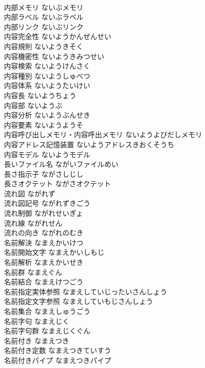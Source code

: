 \documentclass[8pt]{extreport}
\begin{document}
\begin{CJK}{UTF8}{min}
\\	内部メモリ	ないぶメモリ	
\\	内部ラベル	ないぶラベル	
\\	内部リンク	ないぶリンク	
\\	内容完全性	ないようかんぜんせい	
\\	内容規則	ないようきそく	
\\	内容機密性	ないようきみつせい	
\\	内容検索	ないようけんさく	
\\	内容種別	ないようしゅべつ	
\\	内容体系	ないようたいけい	
\\	内容長	ないようちょう	
\\	内容部	ないようぶ	
\\	内容分析	ないようぶんせき	
\\	内容要素	ないようようそ	
\\	内容呼び出しメモリ・内容呼出メモリ	ないようよびだしメモリ	
\\	内容アドレス記憶装置	ないようアドレスきおくそうち	
\\	内容モデル	ないようモデル	
\\	長いファイル名	ながいファイルめい	
\\	長さ指示子	ながさしじし	
\\	長さオクテット	ながさオクテット	
\\	流れ図	ながれず	
\\	流れ図記号	ながれずきごう	
\\	流れ制御	ながれせいぎょ	
\\	流れ線	ながれせん	
\\	流れの向き	ながれのむき	
\\	名前解決	なまえかいけつ	
\\	名前開始文字	なまえかいしもじ	
\\	名前解析	なまえかいせき	
\\	名前群	なまえぐん	
\\	名前結合	なまえけつごう	
\\	名前指定実体参照	なまえしていじったいさんしょう	
\\	名前指定文字参照	なまえしていもじさんしょう	
\\	名前集合	なまえしゅうごう	
\\	名前字句	なまえじく	
\\	名前字句群	なまえじくぐん	
\\	名前付き	なまえつき	
\\	名前付き定数	なまえつきていすう	
\\	名前付きパイプ	なまえつきパイプ	

\end{CJK}
\end{document}
